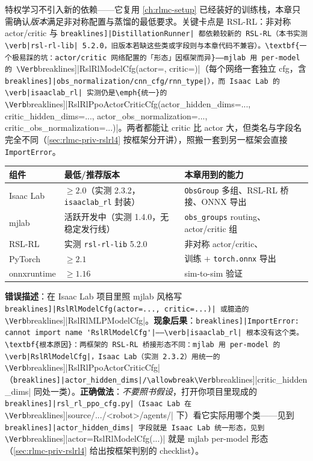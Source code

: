 特权学习不引入新的依赖——它复用 \cref{ch:rlmc-setup} 已经装好的训练栈，本章只需确认\emph{版本}满足非对称配置与蒸馏的最低要求。关键卡点是 RSL-RL：非对称 actor/critic 与 \Verb[breaklines]|DistillationRunner| 都依赖较新的 RSL-RL（本书实测 \verb|rsl-rl-lib| 5.2.0，旧版本若缺这些类或字段则与本章代码不兼容）。\textbf{一个极易踩的坑：actor/critic 网络配置的「形态」因框架而异}——mjlab 用 per-model 的 \Verb[breaklines]|RslRlModelCfg(actor=, critic=)|（每个网络一套独立 cfg，含 \Verb[breaklines]|obs_normalization/cnn_cfg/rnn_type|），而 Isaac Lab 的 \verb|isaaclab_rl| 实测仍是\emph{统一}的 \Verb[breaklines]|RslRlPpoActorCriticCfg(actor_hidden_dims=..., critic_hidden_dims=..., actor_obs_normalization=..., critic_obs_normalization=...)|。两者都能让 critic 比 actor 大，但类名与字段名完全不同（\cref{sec:rlmc-priv-rslrl4} 按框架分开讲），照搬一套到另一框架会直接 \verb|ImportError|。

\begin{center}
\small
\begin{tabular}{@{}lll@{}}
\toprule
组件 & 最低/推荐版本 & 本章用到的能力 \\
\midrule
Isaac Lab & $\ge 2.0$（实测 2.3.2，\verb|isaaclab_rl| 封装） & \verb|ObsGroup| 多组、RSL-RL 桥接、ONNX 导出 \\
mjlab & 活跃开发中（实测 1.4.0，无稳定发行线） & \verb|obs_groups| routing、actor/critic 组 \\
RSL-RL & 实测 \verb|rsl-rl-lib| 5.2.0 & 非对称 actor/critic、\Verb[breaklines]|DistillationRunner|、ONNX exporter \\
PyTorch & $\ge 2.1$ & 训练 + \verb|torch.onnx| 导出 \\
onnxruntime & $\ge 1.16$ & sim-to-sim 验证 \\
\bottomrule
\end{tabular}
\end{center}

\begin{pitfall}
\textbf{错误描述}：在 Isaac Lab 项目里照 mjlab 风格写 \Verb[breaklines]|RslRlModelCfg(actor=..., critic=...)| 或臆造的 \Verb[breaklines]|RslRlMLPModelCfg|。\textbf{现象后果}：\Verb[breaklines]|ImportError: cannot import name 'RslRlModelCfg'|——\verb|isaaclab_rl| 根本没有这个类。\textbf{根本原因}：两框架的 RSL-RL 桥接形态不同：mjlab 用 per-model 的 \verb|RslRlModelCfg|，Isaac Lab（实测 2.3.2）用统一的 \Verb[breaklines]|RslRlPpoActorCriticCfg|（\Verb[breaklines]|actor_hidden_dims|/\allowbreak\Verb[breaklines]|critic_hidden_dims| 同处一类）。\textbf{正确做法}：\emph{不要照书假设}，打开你项目里现成的 \Verb[breaklines]|rsl_rl_ppo_cfg.py|（Isaac Lab 在 \Verb[breaklines]|source/.../<robot>/agents/| 下）看它实际用哪个类——见到 \Verb[breaklines]|actor_hidden_dims| 字段就是 Isaac Lab 统一形态，见到 \Verb[breaklines]|actor=RslRlModelCfg(...)| 就是 mjlab per-model 形态（\cref{sec:rlmc-priv-rslrl4} 给出按框架判别的 checklist）。
\end{pitfall}

